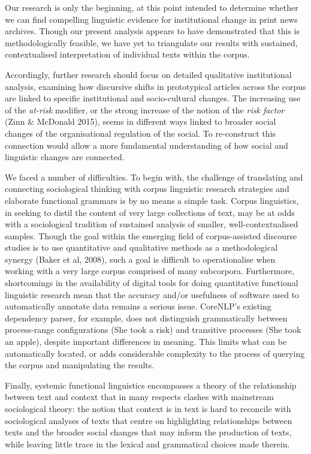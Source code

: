 Our research is only the beginning, at this point intended to determine whether we can find compelling linguistic evidence for institutional change in print news archives. Though our present analysis appears to have demonstrated that this is methodologically feasible, we have yet to triangulate our results with sustained, contextualised interpretation of individual texts within the corpus.

Accordingly, further research should focus on detailed qualitative institutional analysis, examining how discursive shifts in prototypical articles across the corpus are linked to specific institutional and socio-cultural changes. The increasing use of the \emph{at-risk} modifier, or the strong increase of the notion of the \emph{risk factor} (Zinn \& McDonald 2015), seems in different ways linked to broader social changes of the organisational regulation of the social. To re-construct this connection would allow a more fundamental understanding of how social and linguistic changes are connected.

We faced a number of difficulties. To begin with, the challenge of translating and connecting sociological thinking with corpus linguistic research strategies and elaborate functional grammars is by no means a simple task. Corpus linguistics, in seeking to distil the content of very large collections of text, may be at odds with a sociological tradition of sustained analysis of smaller, well-contextualised samples. Though the goal within the emerging field of corpus-assisted discourse studies is to use quantitative and qualitative methods as a methodological synergy (Baker et al, 2008), such a goal is difficult to operationalise when working with a very large corpus comprised of many subcorpora. Furthermore, shortcomings in the availability of digital tools for doing quantitative functional linguistic research mean that the accuracy and\slash or usefulness of software used to automatically annotate data remains a serious issue. CoreNLP's existing dependency parser, for example, does not distinguish grammatically between process-range configurations (She took a risk) and transitive processes (She took an apple), despite important differences in meaning. This limits what can be automatically located, or adds considerable complexity to the process of querying the corpus and manipulating the results.

Finally, systemic functional linguistics encompasses a theory of the relationship between text and context that in many respects clashes with mainstream sociological theory: the notion that context is in text is hard to reconcile with sociological analyses of texts that centre on highlighting relationships between texts and the broader social changes that may inform the production of texts, while leaving little trace in the lexical and grammatical choices made therein.

